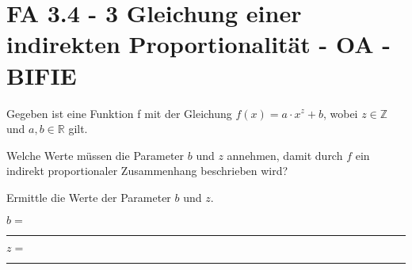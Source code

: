 \section{FA 3.4 - 3 Gleichung einer indirekten Proportionalität - OA - BIFIE}

\begin{beispiel}[FA 3.4]{1} %
Gegeben ist eine Funktion f mit der Gleichung $f(x) = a \cdot x^z + b$, wobei $z\in \mathbb{Z}$ und $a, b \in \mathbb{R}$ gilt.
\leer

Welche Werte müssen die Parameter $b$ und $z$ annehmen, damit durch $f$ ein indirekt proportionaler Zusammenhang beschrieben wird? \leer

Ermittle die Werte der Parameter $b$ und $z$.

\leer

$b=$\rule{5cm}{0.3pt} \leer

$z=$\rule{5cm}{0.3pt}


\end{beispiel}